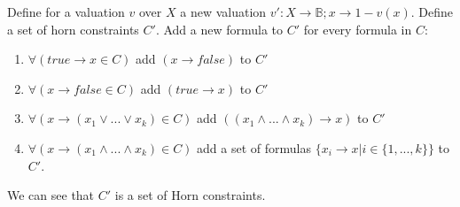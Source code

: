 \documentclass[10pt,a4paper]{article}
\theoremstyle{plain}
\theoremstyle{definition}
\begin{document}
Define for a valuation $v$ over $X$ a new valuation $v': X \to \mathbb{B}; x \to 1-v(x)$.
Define a set of horn constraints $C'$. Add a new formula to $C'$ for every formula in $C$:
\begin{enumerate}
\item $\forall (true \to x\in C)$ add $(x \to false)$ to $C'$
\item $\forall (x \to false\in C)$ add $(true \to x)$ to $C'$
\item $\forall (x \to (x_1 \vee  ... \vee x_k)\in C)$ add $ ((x_1 \wedge...\wedge x_k) \to x)$ to $C'$
\item $\forall (x \to (x_1 \wedge ... \wedge x_k)\in C)$ add a set of formulas $\{x_i \to x | i \in \{1,...,k\}\}$ to $C'$.
\end{enumerate}
We can  see that $C'$ is a set of Horn constraints.
\end{document}
